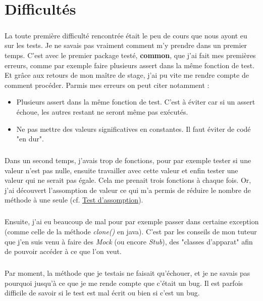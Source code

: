 \chapter{Difficultés}

\paragraph{}
La toute première difficulté rencontrée était le peu de cours que nous ayont eu sur les tests. Je ne savais pas vraiment comment m'y prendre dans un premier temps. C'est avec le premier package testé, \textbf{common}, que j'ai fait mes premières erreurs, comme par exemple faire plusieurs assert dans la même fonction de test. Et grâce aux retours de mon maître de stage, j'ai pu vite me rendre compte de comment procéder. Parmis mes erreurs on peut citer notamment :
\begin{itemize}
    \item Plusieurs assert dans la même fonction de test. C'est à éviter car si un assert échoue, les autres restant ne seront même pas exécutés.
    \item Ne pas mettre des valeurs significatives en constantes. Il faut éviter de codé "en dur".
\end{itemize}

\paragraph{}
Dans un second temps, j'avais trop de fonctions, pour par exemple tester si une valeur n'est pas nulle, ensuite travailler avec cette valeur et enfin tester une valeur qui ne serait pas égale. Cela me prenait trois fonctions à chaque fois. Or, j'ai découvert l'assomption de valeur ce qui m'a permis de réduire le nombre de méthode à une seule (cf. \hyperref[assume]{\color{blue}\underline{Test d'assomption}}).

\paragraph{}
Ensuite, j'ai eu beaucoup de mal pour par exemple passer dans certaine exception (comme celle de la méthode \textit{clone()} en java). C'est par les conseils de mon tuteur que j'en suis venu à faire des \textit{Mock} (ou encore \textit{Stub}), des "classes d'apparat" afin de pouvoir accéder à ce que l'on veut.

\paragraph{}
Par moment, la méthode que je testais ne faisait qu'échouer, et je ne savais pas pourquoi jusqu'à ce que je me rende compte que c'était un bug. Il est parfois difficile de savoir si le test est mal écrit ou bien si c'est un bug.

